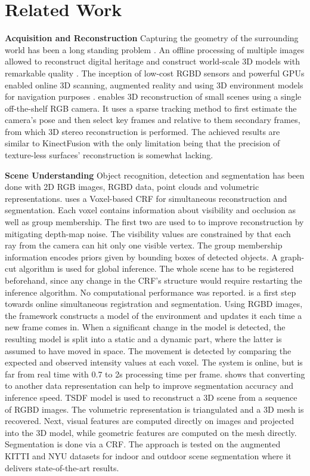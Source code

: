 \documentclass{llncs}
\begin{document}
\section{Related Work}

  \textbf{Acquisition and Reconstruction } Capturing the geometry of the surrounding world has been a long standing problem \cite{old}. An offline processing of multiple images allowed to reconstruct digital heritage and construct world-scale 3D models with remarkable quality \cite{heritage}. The inception of low-cost RGBD sensors and powerful GPUs enabled online 3D scanning, augmented reality and using 3D environment models for navigation purposes \cite{fusion}. \cite{Monofusion} enables 3D reconstruction of small scenes using a single off-the-shelf RGB camera. It uses a sparse tracking method to first estimate the camera's pose and then select key frames and relative to them secondary frames, from which 3D stereo reconstruction is performed. The achieved results are similar to KinectFusion with the only limitation being that the precision of texture-less surfaces' reconstruction is somewhat lacking. 
  
  \noindent
  \textbf{Scene Understanding } Object recognition, detection and segmentation has been done with 2D RGB images, RGBD data, point clouds and volumetric representations. \cite{VCRF} uses a Voxel-based CRF for simultaneous reconstruction and segmentation. Each voxel contains information about visibility and occlusion as well as group membership. The first two are used to to improve reconstruction by mitigating depth-map noise. The visibility values are constrained by that each ray from the camera can hit only one visible vertex. The group membership information encodes priors given by bounding boxes of detected objects. A graph-cut algorithm is used for global inference. The whole scene has to be registered beforehand, since any change in the CRF's structure would require restarting the inference algorithm. No computational performance was reported. \cite{ChangeDetection} is a first step towards online simultaneous registration and segmentation. Using RGBD images, the framework constructs a model of the environment and updates it each time a new frame comes in. When a significant change in the model is detected, the resulting model is split into a static and a dynamic part, where the latter is assumed to have moved in space. The movement is detected by comparing the expected and observed intensity values at each voxel. The system is online, but is far from real time with 0.7 to 2s processing time per frame. \cite{mesh} shows that converting to another data representation can help to improve segmentation accuracy and inference speed. TSDF model is used to reconstruct a 3D scene from a sequence of RGBD images. The volumetric representation is triangulated and a 3D mesh is recovered. Next, visual features are computed directly on images and projected into the 3D model, while geometric features are computed on the mesh directly. Segmentation is done via a CRF. The approach is tested on the augmented KITTI and NYU datasets for indoor and outdoor scene segmentation where it delivers state-of-the-art results. 
      
\end{document}
